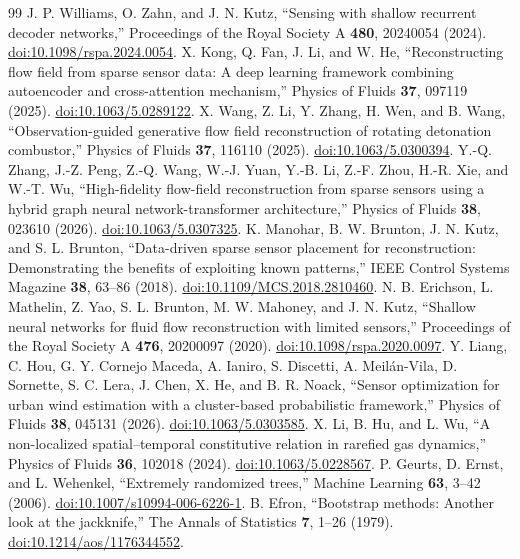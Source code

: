\documentclass[aip,pof,preprint,floatfix,amsmath,amssymb]{revtex4-2}
\begin{document}
\begin{thebibliography}{99}
 J. P. Williams, O. Zahn, and J. N. Kutz, ``Sensing with shallow recurrent decoder networks,'' Proceedings of the Royal Society A \textbf{480}, 20240054 (2024). \href{https://doi.org/10.1098/rspa.2024.0054}{doi:10.1098/rspa.2024.0054}.
 X. Kong, Q. Fan, J. Li, and W. He, ``Reconstructing flow field from sparse sensor data: A deep learning framework combining autoencoder and cross-attention mechanism,'' Physics of Fluids \textbf{37}, 097119 (2025). \href{https://doi.org/10.1063/5.0289122}{doi:10.1063/5.0289122}.
 X. Wang, Z. Li, Y. Zhang, H. Wen, and B. Wang, ``Observation-guided generative flow field reconstruction of rotating detonation combustor,'' Physics of Fluids \textbf{37}, 116110 (2025). \href{https://doi.org/10.1063/5.0300394}{doi:10.1063/5.0300394}.
 Y.-Q. Zhang, J.-Z. Peng, Z.-Q. Wang, W.-J. Yuan, Y.-B. Li, Z.-F. Zhou, H.-R. Xie, and W.-T. Wu, ``High-fidelity flow-field reconstruction from sparse sensors using a hybrid graph neural network-transformer architecture,'' Physics of Fluids \textbf{38}, 023610 (2026). \href{https://doi.org/10.1063/5.0307325}{doi:10.1063/5.0307325}.
 K. Manohar, B. W. Brunton, J. N. Kutz, and S. L. Brunton, ``Data-driven sparse sensor placement for reconstruction: Demonstrating the benefits of exploiting known patterns,'' IEEE Control Systems Magazine \textbf{38}, 63--86 (2018). \href{https://doi.org/10.1109/MCS.2018.2810460}{doi:10.1109/MCS.2018.2810460}.
 N. B. Erichson, L. Mathelin, Z. Yao, S. L. Brunton, M. W. Mahoney, and J. N. Kutz, ``Shallow neural networks for fluid flow reconstruction with limited sensors,'' Proceedings of the Royal Society A \textbf{476}, 20200097 (2020). \href{https://doi.org/10.1098/rspa.2020.0097}{doi:10.1098/rspa.2020.0097}.
 Y. Liang, C. Hou, G. Y. Cornejo Maceda, A. Ianiro, S. Discetti, A. Meil\'an-Vila, D. Sornette, S. C. Lera, J. Chen, X. He, and B. R. Noack, ``Sensor optimization for urban wind estimation with a cluster-based probabilistic framework,'' Physics of Fluids \textbf{38}, 045131 (2026). \href{https://doi.org/10.1063/5.0303585}{doi:10.1063/5.0303585}.
 X. Li, B. Hu, and L. Wu, ``A non-localized spatial--temporal constitutive relation in rarefied gas dynamics,'' Physics of Fluids \textbf{36}, 102018 (2024). \href{https://doi.org/10.1063/5.0228567}{doi:10.1063/5.0228567}.
 P. Geurts, D. Ernst, and L. Wehenkel, ``Extremely randomized trees,'' Machine Learning \textbf{63}, 3--42 (2006). \href{https://doi.org/10.1007/s10994-006-6226-1}{doi:10.1007/s10994-006-6226-1}.
 B. Efron, ``Bootstrap methods: Another look at the jackknife,'' The Annals of Statistics \textbf{7}, 1--26 (1979). \href{https://doi.org/10.1214/aos/1176344552}{doi:10.1214/aos/1176344552}.

\end{thebibliography}
\end{document}
